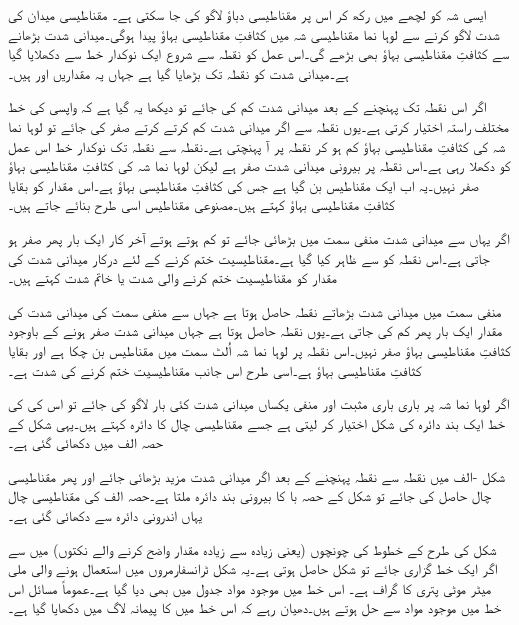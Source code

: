 	ایسی شہ کو لچھے میں رکھ کر اس پر مقناطیسی دباؤ لاگو کی جا سکتی ہے۔ مقناطیسی میدان کی شدت   لاگو کرنے سے لوہا نما مقناطیسی شہ میں کثافتِ مقناطیسی بہاؤ   پیدا ہوگی۔میدانی شدت بڑھانے سے کثافتِ مقناطیسی بہاؤ بھی بڑھے گی۔اس عمل کو نقطہ   سے شروع ایک نوکدار خط سے دکھلایا گیا ہے۔میدانی شدت کو نقطہ   تک بڑھایا گیا ہے جہاں یہ مقداریں   اور  ہیں۔

	اگر اس نقطہ تک پہنچنے کے بعد میدانی شدت کم کی جائے تو دیکھا یہ گیا ہے کہ واپسی کی خط مختلف راستہ اختیار کرتی ہے۔یوں نقطہ   سے اگر میدانی شدت کم کرتے کرتے صفر کی جائے تو لوہا نما شہ کی کثافتِ مقناطیسی بہاؤ کم ہو کر نقطہ  پر آ پہنچتی ہے۔نقطہ  سے نقطہ  تک نوکدار خط اس عمل کو دکھلا رہی ہے۔اس نقطہ پر بیرونی میدانی شدت صفر ہے لیکن لوہا نما شہ کی کثافتِ مقناطیسی بہاؤ صفر نہیں۔یہ اب ایک مقناطیس بن گیا ہے جس کی کثافتِ مقناطیسی بہاؤ   ہے۔اس مقدار کو بقایا کثافتِ مقناطیسی بہاؤ  کہتے ہیں۔مصنوعی مقناطیس اسی طرح بنائے جاتے ہیں۔

اگر یہاں سے میدانی شدت منفی سمت میں بڑھائی جائے تو  کم ہوتے ہوتے آخر کار ایک بار پھر صفر ہو جاتی ہے۔اس نقطہ کو  سے ظاہر کیا گیا ہے۔مقناطیسیت ختم کرنے کے لئے درکار میدانی شدت کی مقدار   کو مقناطیسیت ختم کرنے والی شدت یا خاتم شدت کہتے ہیں۔

منفی سمت میں میدانی شدت بڑھاتے نقطہ  حاصل ہوتا ہے جہاں سے منفی سمت کی میدانی شدت کی مقدار ایک بار پھر کم کی جاتی ہے۔یوں نقطہ  حاصل ہوتا ہے جہاں میدانی شدت صفر ہونے کے باوجود کثافتِ مقناطیسی بہاؤ صفر نہیں۔اس نقطہ پر لوہا نما شہ اُلٹ سمت میں مقناطیس بن چکا ہے اور  بقایا کثافتِ مقناطیسی بہاؤ ہے۔اسی طرح اس جانب مقناطیسیت ختم کرنے کی شدت  ہے۔

اگر لوہا نما شہ پر باری باری مثبت اور منفی  یکساں میدانی شدت کئی بار لاگو کی جائے تو اس کی   کی خط ایک بند دائرہ کی شکل اختیار کر لیتی ہے جسے مقناطیسی چال کا دائرہ  کہتے ہیں۔یہی شکل کے حصہ الف میں دکھائی گئی ہے۔

شکل -الف میں نقطہ   سے نقطہ   پہنچنے کے بعد اگر میدانی شدت مزید بڑھائی جائے اور پھر مقناطیسی چال حاصل کی جائے تو شکل کے حصہ با کا بیرونی بند دائرہ ملتا ہے۔حصہ الف کی مقناطیسی چال یہاں اندرونی دائرہ سے دکھائی گئی ہے۔

شکل    کی طرح کے خطوط کی چونچوں (یعنی زیادہ سے زیادہ مقدار واضح کرنے والے نکتوں) میں سے اگر ایک خط گزاری جائے تو شکل   حاصل ہوتی ہے۔یہ شکل ٹرانسفارمروں میں استعمال ہونے والی    ملی میٹر موٹی  پتری کا گراف ہے۔ اس خط میں موجود مواد جدول   میں بھی دیا گیا ہے۔عموماً مسائل اس خط میں موجود مواد سے حل ہوتے ہیں۔دھیان رہے کہ اس خط میں   کا پیمانہ لاگ میں دکھایا گیا ہے۔

